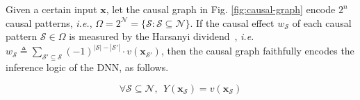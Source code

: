 \label{th:harsanyi-faithful}
Given a certain input {\small$\boldsymbol{x}$}, let the causal graph in Fig. \ref{fig:causal-graph} encode {\small$2^n$} causal patterns, \emph{i.e.}, {\small$\Omega=2^{\mathcal{N}}=\{\mathcal{S}: \mathcal{S}\subseteq\mathcal{N}\}$}.
If the causal effect {\small$w_{\mathcal{S}}$} of each causal pattern {\small$\mathcal{S}\in\Omega$} is measured by the Harsanyi dividend~\cite{harsanyi1963simplified}, \emph{i.e.} {\small$w_{\mathcal{S}} \triangleq {\sum}_{\mathcal{S}'\subseteq \mathcal{S}}(-1)^{|\mathcal{S}|-|\mathcal{S}'|}\cdot v(\boldsymbol{x}_{\mathcal{S}'})$}, then the causal graph faithfully encodes the inference logic of the DNN, as follows.
\vspace{-3pt}
\begin{small}
\begin{equation}
    \forall \mathcal{S}\subseteq \mathcal{N},\ \ 
    Y(\boldsymbol{x}_{\mathcal{S}}) = v(\boldsymbol{x}_{\mathcal{S}})
\end{equation}
\end{small}
